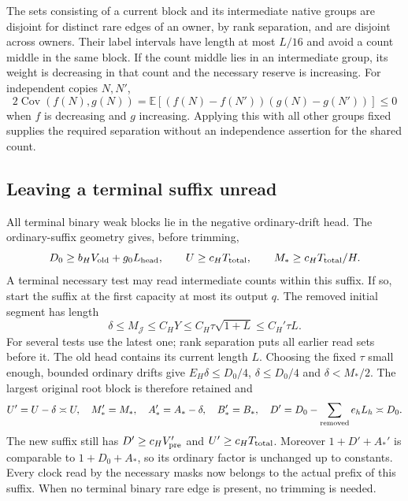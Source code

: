 The sets consisting of a current block and its intermediate native
groups are disjoint for distinct rare edges of an owner, by rank
separation, and are disjoint across owners. Their label intervals
have length at most $L/16$ and avoid a count middle in the same
block. If the count middle lies in an intermediate group, its weight
is decreasing in that count and the necessary reserve is increasing.
For independent copies $N,N'$,
\[
 2\operatorname{Cov}(f(N),g(N))
 =\mathbb E[(f(N)-f(N'))(g(N)-g(N'))]\leq0
\]
when $f$ is decreasing and $g$ increasing. Applying this with all
other groups fixed supplies the required separation without an
independence assertion for the shared count.

\subsection{Leaving a terminal suffix unread}
\label{updetail:terminal-trimming}
All terminal binary weak blocks lie in the negative ordinary-drift
head. The ordinary-suffix geometry gives, before trimming,
\[
 D_0\geq b_HV_{\rm old}+g_0L_{\rm head},\qquad
 U\geq c_HT_{\rm total},\qquad M_*\geq c_HT_{\rm total}/H.
\]
A terminal necessary test may read intermediate counts within this
suffix. If so, start the suffix at the first capacity at most its
output $q$. The removed initial segment has length
\[
 \delta\leq M_{\mathcal J}\leq C_HY
 \leq C_H\tau\sqrt{1+L}\leq C_H'\tau L.
\]
For several tests use the latest one; rank separation puts all earlier
read sets before it. The old head contains its current length $L$.
Choosing the fixed $\tau$ small enough, bounded ordinary drifts give
$E_H\delta\leq D_0/4$, $\delta\leq D_0/4$ and $\delta<M_*/2$.
The largest original root block is therefore retained and
\[
 U'=U-\delta\asymp U,\quad M_*'=M_*,\quad
 A_*'=A_*-\delta,\quad B_*'=B_*,\quad
 D'=D_0-\sum_{\rm removed}e_hL_h\asymp D_0.
\]
The new suffix still has $D'\geq c_HV_{\rm pre}'$ and
$U'\geq c_HT_{\rm total}$. Moreover $1+D'+A_*'$ is comparable to
$1+D_0+A_*$, so its ordinary factor is unchanged up to constants.
Every clock read by the necessary masks now belongs to the actual
prefix of this suffix. When no terminal binary rare edge is present,
no trimming is needed.

